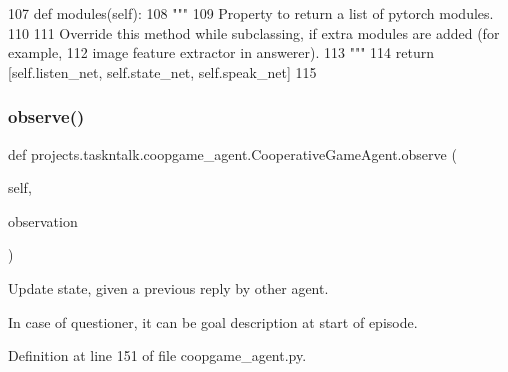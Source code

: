 \begin{DoxyCode}
107     \textcolor{keyword}{def }modules(self):
108         \textcolor{stringliteral}{"""}
109 \textcolor{stringliteral}{        Property to return a list of pytorch modules.}
110 \textcolor{stringliteral}{}
111 \textcolor{stringliteral}{        Override this method while subclassing, if extra modules are added (for example,}
112 \textcolor{stringliteral}{        image feature extractor in answerer).}
113 \textcolor{stringliteral}{        """}
114         \textcolor{keywordflow}{return} [self.listen\_net, self.state\_net, self.speak\_net]
115 
\end{DoxyCode}
\mbox{\label{classprojects_1_1taskntalk_1_1coopgame__agent_1_1CooperativeGameAgent_a6c3dbce5e745edf451daff9474b6a52f}} 
\subsubsection{\texorpdfstring{observe()}{observe()}}
{\footnotesize\ttfamily def projects.\+taskntalk.\+coopgame\+\_\+agent.\+Cooperative\+Game\+Agent.\+observe (\begin{DoxyParamCaption}\item[{}]{self,  }\item[{}]{observation }\end{DoxyParamCaption})}

\begin{DoxyVerb}Update state, given a previous reply by other agent.

In case of questioner, it can be goal description at start of episode.
\end{DoxyVerb}
 

Definition at line 151 of file coopgame\+\_\+agent.\+py.


